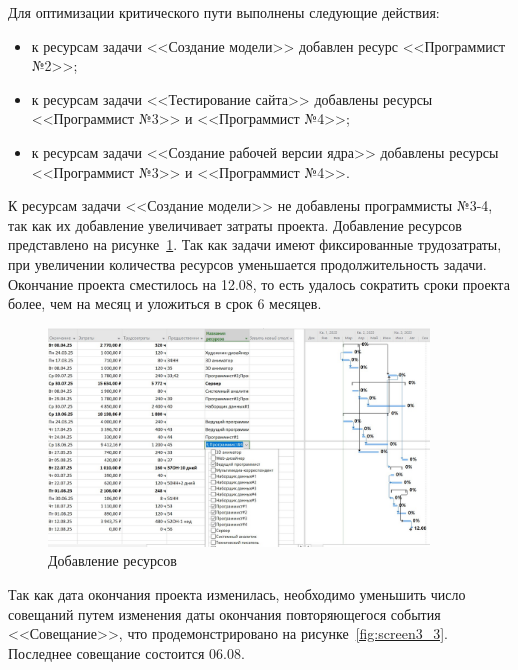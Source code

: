 Для оптимизации критического пути выполнены следующие действия:
\begin{itemize}[label=---]
	\item к ресурсам задачи <<Создание модели>> добавлен ресурс <<Программист №2>>;
	\item к ресурсам задачи <<Тестирование сайта>> добавлены ресурсы <<Программист №3>> и <<Программист №4>>;
	\item к ресурсам задачи <<Создание рабочей версии ядра>> добавлены ресурсы <<Программист №3>> и <<Программист №4>>.
\end{itemize}

К ресурсам задачи <<Создание модели>> не добавлены программисты №3-4, так как их добавление увеличивает затраты проекта.
Добавление ресурсов представлено на рисунке~\ref{fig:screen3_2}.
Так как задачи имеют фиксированные трудозатраты, при увеличении количества ресурсов уменьшается продолжительность задачи.
Окончание проекта сместилось на 12.08, то есть удалось сократить сроки проекта более, чем на месяц и уложиться в срок 6 месяцев.

\begin{figure}[H]
	\centering
	\includegraphics[width=0.9\textwidth]{img/task3/screen2.jpg}
	\caption{Добавление ресурсов}
	\label{fig:screen3_2}
\end{figure}

Так как дата окончания проекта изменилась, необходимо уменьшить число совещаний путем изменения даты окончания повторяющегося события <<Совещание>>, что продемонстрировано на рисунке~\ref{fig:screen3_3}.
Последнее совещание состоится 06.08.

